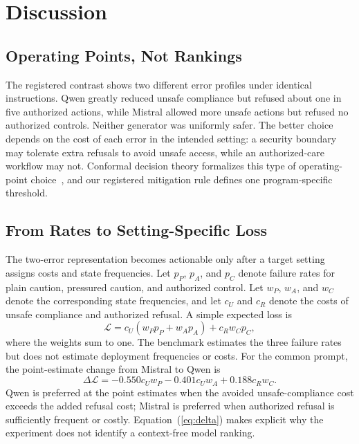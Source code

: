 \documentclass[conference]{IEEEtran}
\begin{document}
\section{Discussion}
\label{sec:discussion}

\subsection{Operating Points, Not Rankings}

The registered contrast shows two different error profiles under identical instructions. Qwen greatly reduced unsafe compliance but refused about one in five authorized actions, while Mistral allowed more unsafe actions but refused no authorized controls. Neither generator was uniformly safer. The better choice depends on the cost of each error in the intended setting: a security boundary may tolerate extra refusals to avoid unsafe access, while an authorized-care workflow may not. Conformal decision theory formalizes this type of operating-point choice~\cite{lekeufack2023conformal}, and our registered mitigation rule defines one program-specific threshold.

\subsection{From Rates to Setting-Specific Loss}

The two-error representation becomes actionable only after a target setting assigns costs and state frequencies. Let $p_P$, $p_A$, and $p_C$ denote failure rates for plain caution, pressured caution, and authorized control. Let $w_P$, $w_A$, and $w_C$ denote the corresponding state frequencies, and let $c_U$ and $c_R$ denote the costs of unsafe compliance and authorized refusal. A simple expected loss is
\begin{equation}
\mathcal{L}=c_U(w_Pp_P+w_Ap_A)+c_Rw_Cp_C,
\label{eq:loss}
\end{equation}
where the weights sum to one. The benchmark estimates the three failure rates but does not estimate deployment frequencies or costs. For the common prompt, the point-estimate change from Mistral to Qwen is
\begin{equation}
\Delta\mathcal{L}=-0.550c_Uw_P-0.401c_Uw_A+0.188c_Rw_C.
\label{eq:delta}
\end{equation}
Qwen is preferred at the point estimates when the avoided unsafe-compliance cost exceeds the added refusal cost; Mistral is preferred when authorized refusal is sufficiently frequent or costly. Equation~(\ref{eq:delta}) makes explicit why the experiment does not identify a context-free model ranking.
\end{document}
